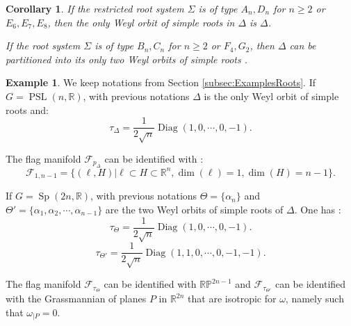 \documentclass[reqno,10pt]{amsart}
\theoremstyle{plain}
\newtheorem{cor}[thm]{Corollary}
\theoremstyle{definition}
\newtheorem{exmp}[thm]{Example}
\theoremstyle{remark}
\newcommand{\type}{\tau}
\newcommand{\R}{\mathbb{R}}
\DeclareMathOperator{\PSL}{PSL}
\DeclareMathOperator{\Sp}{Sp}
\DeclareMathOperator{\Diag}{Diag}
\newcommand{\ie}{namely }
\begin{document}
\begin{cor}
\label{cor:RootsWeylOrbit}
If the restricted root system $\Sigma$ is of type $A_n,D_n$ for $n\geq 2$ or $E_6,E_7,E_8$, then the only Weyl orbit of simple roots in $\Delta$ is $\Delta$.

If the root system $\Sigma$ is of type $B_n,C_n$ for $n\geq 2$ or $F_4,G_2$, then $\Delta$ can be partitioned into its only two Weyl orbits of simple roots .
\end{cor}

\begin{exmp}
We keep notations from Section \ref{subsec:ExamplesRoots}. If $G=\PSL(n,\R)$, with previous notations $\Delta$ is the only Weyl orbit of simple roots  and:
$$\type_\Delta=\frac{1}{2\sqrt{n}}\Diag(1,0,\cdots,0,-1). $$

The flag manifold $\mathcal{F}_{p_\Delta}$ can be identified with :
$$\mathcal{F}_{1,n-1}=\lbrace(\ell,H)|\ell\subset H\subset \R^n, \dim(\ell)=1,\dim(H)=n-1\rbrace.$$

\medskip

If $G=\Sp(2n,\R)$,  with previous notations $\Theta=\lbrace\alpha_n\rbrace$ and $\Theta'=\lbrace\alpha_1,\alpha_2,\cdots,\alpha_{n-1}\rbrace$ are the two Weyl orbits of simple roots of $\Delta$. One has :
$$\type_\Theta=\frac{1}{2\sqrt{n}}\Diag(1,0,\cdots,0,-1). $$
$$\type_{\Theta'}=\frac{1}{2\sqrt{n}}\Diag(1,1,0,\cdots,0,-1,-1). $$

The flag manifold $\mathcal{F}_{\type_\Theta}$ can be identified with $\mathbb{RP}^{2n-1}$ and $\mathcal{F}_{\type_{\Theta'}}$ can be identified with the Grassmannian of planes $P$ in $\R^{2n}$ that are isotropic for $\omega$, \ie such that $\omega_{|P}=0$.
\end{exmp}
\end{document}
